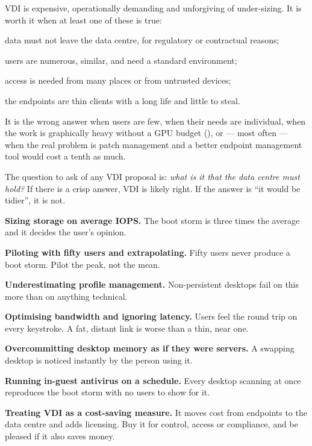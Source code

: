 \begin{conceptbox}
VDI is expensive, operationally demanding and unforgiving of under-sizing. It
is worth it when at least one of these is true:

\begin{tight}
  \item data must not leave the data centre, for regulatory or contractual
        reasons;
  \item users are numerous, similar, and need a standard environment;
  \item access is needed from many places or from untrusted devices;
  \item the endpoints are thin clients with a long life and little to steal.
\end{tight}

\smallskip
It is the wrong answer when users are few, when their needs are individual,
when the work is graphically heavy without a GPU budget (), or ---
most often --- when the real problem is patch management and a better endpoint
management tool would cost a tenth as much.

\smallskip
The question to ask of any VDI proposal is: \emph{what is it that the data
centre must hold?} If there is a crisp answer, VDI is likely right. If the
answer is ``it would be tidier'', it is not.
\end{conceptbox}

\begin{pitfall}
\begin{tight}
  \item \textbf{Sizing storage on average IOPS.} The boot storm is three times
        the average and it decides the user's opinion.
  \item \textbf{Piloting with fifty users and extrapolating.} Fifty users never
        produce a boot storm. Pilot the peak, not the mean.
  \item \textbf{Underestimating profile management.} Non-persistent desktops
        fail on this more than on anything technical.
  \item \textbf{Optimising bandwidth and ignoring latency.} Users feel the
        round trip on every keystroke. A fat, distant link is worse than a thin,
        near one.
  \item \textbf{Overcommitting desktop memory as if they were servers.} A
        swapping desktop is noticed instantly by the person using it.
  \item \textbf{Running in-guest antivirus on a schedule.} Every desktop
        scanning at once reproduces the boot storm with no users to show for
        it.
  \item \textbf{Treating VDI as a cost-saving measure.} It moves cost from
        endpoints to the data centre and adds licensing. Buy it for control,
        access or compliance, and be pleased if it also saves money.
\end{tight}
\end{pitfall}

